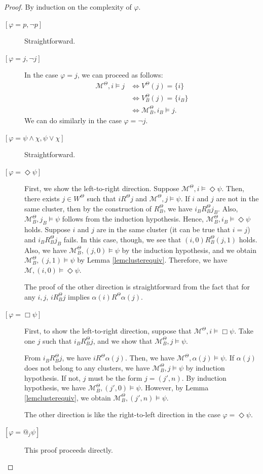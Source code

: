 \documentclass[10pt,a4paper]{amsart}
\newcommand{\Dia}{\Diamond}
\newcommand{\Kmodel}{\mathcal{M}}
\begin{document}
\begin{proof}
    By induction on the complexity of $\varphi$.
    \begin{description}
        \item[{$[\varphi = p, \neg p]$}] Straightforward.
        \item[{$[\varphi = j, \neg j]$}] In the case $\varphi = j$, we can proceed as follows:
        \begin{align*}
            \Kmodel^\Theta, i \models j &\iff V^\Theta(j) = \{ i \} \\
            &\iff V^\Theta_B(j) = \{ i_B \} \\
            &\iff \Kmodel^\Theta_B, i_B \models j .
        \end{align*}
        We can do similarly in the case $\varphi = \neg j$.
        \item[{$[\varphi = \psi \land \chi, \psi \lor \chi]$}] Straightforward.
        \item[{$[\varphi = \Dia \psi]$}] First, we show the left-to-right direction. Suppose $\Kmodel^\Theta, i \models \Dia \psi$. Then, there exists $j \in W^\Theta$ such that $i R^\Theta j$ and $\Kmodel^\Theta, j \models \psi$. If $i$ and $j$ are not in the same cluster, then by the construction of $R^\Theta_B$, we have $i_B R^\Theta_B j_B$. Also, $\Kmodel^\Theta_B, j_B \models \psi$ follows from the induction hypothesis. Hence, $\Kmodel^\Theta_B, i_B \models \Dia \psi$ holds. Suppose $i$ and $j$ are in the same cluster (it can be true that $i = j$) and $i_B R^\Theta_B j_B$ fails. In this case, though, we see that $(i, 0) R^\Theta_B (j, 1)$ holds. Also, we have $\Kmodel^\Theta_B, (j, 0) \models \psi$ by the induction hypothesis, and we obtain $\Kmodel^\Theta_B, (j, 1) \models \psi$ by Lemma \ref{lemclusterequiv}. Therefore, we have $\Kmodel, (i, 0) \models \Dia \psi$. 

        The proof of the other direction is straightforward from the fact that for any $i, j$, $i R^\Theta_B j$ implies $\alpha(i) R^\Theta \alpha(j)$. 
        \item[{$[\varphi = \Box \psi]$}] First, to show the left-to-right direction, suppose that $\Kmodel^\Theta, i \models \Box \psi$. Take one $j$ such that $i_B R^\Theta_B j$, and we show that $\Kmodel^\Theta_B, j \models \psi$.

        From $i_B R^\Theta_B j$, we have $i R^\Theta \alpha(j)$. Then, we have $\Kmodel^\Theta, \alpha(j) \models \psi$. If $\alpha(j)$ does not belong to any clusters, we have $\Kmodel^\Theta_B, j \models \psi$ by induction hypothesis. If not, $j$ must be the form $j = (j', n)$. By induction hypothesis, we have $\Kmodel^\Theta_B, (j', 0) \models \psi$. However, by Lemma \ref{lemclusterequiv}, we obtain $\Kmodel^\Theta_B, (j', n) \models \psi$.

        The other direction is like the right-to-left direction in the case $\varphi = \Dia \psi$. 
        \item[{$[\varphi = @_j \psi]$}] This proof proceeds directly. \qedhere
    \end{description}
\end{proof}
\end{document}
